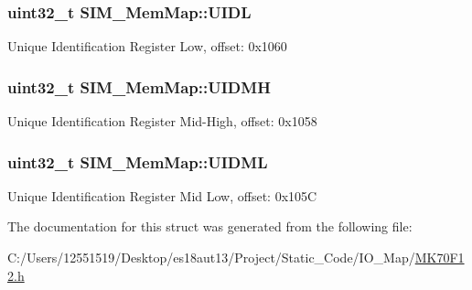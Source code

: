 \subsubsection[{U\+I\+D\+L}]{\setlength{\rightskip}{0pt plus 5cm}uint32\+\_\+t S\+I\+M\+\_\+\+Mem\+Map\+::\+U\+I\+D\+L}\label{struct_s_i_m___mem_map_ac23a694afa8d84e55fc43ff0c0ec1b29}
Unique Identification Register Low, offset\+: 0x1060 \hypertarget{struct_s_i_m___mem_map_af4fb6d5bc3fa71f9c905570d87a2e93f}{}
\subsubsection[{U\+I\+D\+M\+H}]{\setlength{\rightskip}{0pt plus 5cm}uint32\+\_\+t S\+I\+M\+\_\+\+Mem\+Map\+::\+U\+I\+D\+M\+H}\label{struct_s_i_m___mem_map_af4fb6d5bc3fa71f9c905570d87a2e93f}
Unique Identification Register Mid-\/\+High, offset\+: 0x1058 \hypertarget{struct_s_i_m___mem_map_a51e871d8ac13db8b605b6ec1b3292be4}{}
\subsubsection[{U\+I\+D\+M\+L}]{\setlength{\rightskip}{0pt plus 5cm}uint32\+\_\+t S\+I\+M\+\_\+\+Mem\+Map\+::\+U\+I\+D\+M\+L}\label{struct_s_i_m___mem_map_a51e871d8ac13db8b605b6ec1b3292be4}
Unique Identification Register Mid Low, offset\+: 0x105\+C 

The documentation for this struct was generated from the following file\+:\begin{DoxyCompactItemize}
\item 
C\+:/\+Users/12551519/\+Desktop/es18aut13/\+Project/\+Static\+\_\+\+Code/\+I\+O\+\_\+\+Map/\hyperlink{_m_k70_f12_8h}{M\+K70\+F12.\+h}\end{DoxyCompactItemize}
